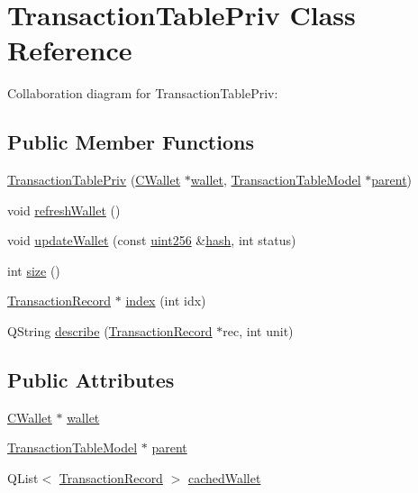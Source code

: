 \hypertarget{class_transaction_table_priv}{}\section{Transaction\+Table\+Priv Class Reference}
\label{class_transaction_table_priv}


Collaboration diagram for Transaction\+Table\+Priv\+:
\subsection*{Public Member Functions}
\begin{DoxyCompactItemize}
\item 
\hyperlink{class_transaction_table_priv_a19c3442de869b47471ab3a1989a5a746}{Transaction\+Table\+Priv} (\hyperlink{class_c_wallet}{C\+Wallet} $\ast$\hyperlink{class_transaction_table_priv_a01cb7d238e5dea44b9f7f1ee75d5849d}{wallet}, \hyperlink{class_transaction_table_model}{Transaction\+Table\+Model} $\ast$\hyperlink{class_transaction_table_priv_a358d460cf7c3074fba12d03cdc5f638d}{parent})
\item 
void \hyperlink{class_transaction_table_priv_a1f81da5d7cfb2aac03a5e18e6bc91792}{refresh\+Wallet} ()
\item 
void \hyperlink{class_transaction_table_priv_a27eb6d3e1f7717dd2cad80c5ce48f404}{update\+Wallet} (const \hyperlink{classuint256}{uint256} \&\hyperlink{cache_8cc_a11ecb029164e055f28f4123ce3748862}{hash}, int status)
\item 
int \hyperlink{class_transaction_table_priv_acc5c85ae550eca3a35b7b4d68d0994bf}{size} ()
\item 
\hyperlink{class_transaction_record}{Transaction\+Record} $\ast$ \hyperlink{class_transaction_table_priv_ac692aa6aa7820e80accc971c70e0fae5}{index} (int idx)
\item 
Q\+String \hyperlink{class_transaction_table_priv_ab08d44e16bf6dd95b5b83959b3013780}{describe} (\hyperlink{class_transaction_record}{Transaction\+Record} $\ast$rec, int unit)
\end{DoxyCompactItemize}
\subsection*{Public Attributes}
\begin{DoxyCompactItemize}
\item 
\hyperlink{class_c_wallet}{C\+Wallet} $\ast$ \hyperlink{class_transaction_table_priv_a01cb7d238e5dea44b9f7f1ee75d5849d}{wallet}
\item 
\hyperlink{class_transaction_table_model}{Transaction\+Table\+Model} $\ast$ \hyperlink{class_transaction_table_priv_a358d460cf7c3074fba12d03cdc5f638d}{parent}
\item 
Q\+List$<$ \hyperlink{class_transaction_record}{Transaction\+Record} $>$ \hyperlink{class_transaction_table_priv_a410380e0d05152cf1d121f0ba0727ea8}{cached\+Wallet}
\end{DoxyCompactItemize}


